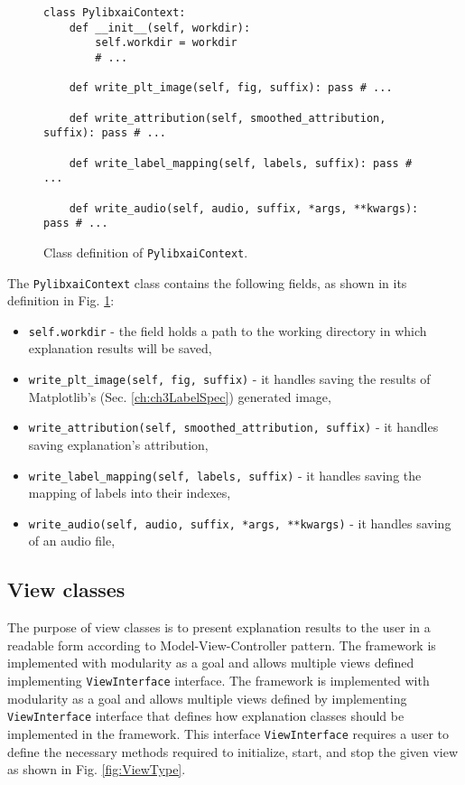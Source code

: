 \documentclass[
    bindingoffset=5mm,  %
    footnoteindent=3mm, %
    hyphenation=true    %
]{src/wut-thesis}
\begin{document}
\begin{figure}%
\begin{verbatim}
class PylibxaiContext:
    def __init__(self, workdir):
        self.workdir = workdir
        # ...
    
    def write_plt_image(self, fig, suffix): pass # ...
    
    def write_attribution(self, smoothed_attribution, suffix): pass # ...

    def write_label_mapping(self, labels, suffix): pass # ...
    
    def write_audio(self, audio, suffix, *args, **kwargs): pass # ...
\end{verbatim}
\caption{Class definition of \texttt{PylibxaiContext}.}
\label{fig:PylibxaiContext}
\end{figure}

The \texttt{PylibxaiContext} class contains the following fields, as shown in its definition in Fig. \ref{fig:PylibxaiContext}:

\begin{itemize}
    \item \texttt{self.workdir} - the field holds a path to the working directory in which explanation results will be saved,
    \item \texttt{write_plt_image(self, fig, suffix)} - it handles saving the results of Matplotlib's (Sec. \ref{ch:ch3LabelSpec}) generated image,
    \item \texttt{write_attribution(self, smoothed_attribution, suffix)} - it handles saving explanation's attribution,
    \item \texttt{write_label_mapping(self, labels, suffix)} - it handles saving the mapping of labels into their indexes,
    \item \texttt{write_audio(self, audio, suffix, *args, **kwargs)} - it handles saving of an audio file,
\end{itemize}

\subsection{View classes}

The purpose of view classes is to present explanation results to the user in a readable form
according to Model-View-Controller pattern. The framework is implemented with modularity as a goal
and allows multiple views defined implementing \texttt{ViewInterface} interface.
The framework is implemented with modularity as a goal and allows multiple views
defined by implementing \texttt{ViewInterface} interface that defines how explanation
classes should be implemented in the framework.
This interface \texttt{ViewInterface} requires a user to define the necessary
methods required to initialize, start, and stop the given view as shown in Fig. \ref{fig:ViewType}.
\end{document}
